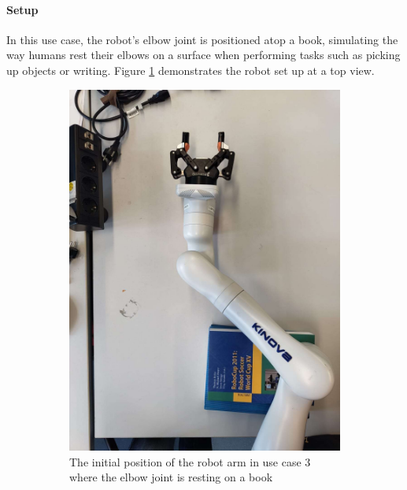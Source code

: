 \documentclass[report.tex]{subfiles}
\begin{document}
    \paragraph{\large{Setup}\\}
    In this use case, the robot's elbow joint is positioned atop a book, simulating the way humans rest their elbows on a surface when performing tasks such as picking up objects or writing. Figure \ref{fig:us3_init} demonstrates the robot set up at a top view.
    \begin{figure}[H]
        \captionsetup[subfigure]{justification=centering}
        \begin{subfigure}{0.5\textwidth}
        \includegraphics[width=\linewidth]{images/us3_initial.jpg}
        \caption{The initial position of the robot arm in use case 3 where the elbow joint is resting on a book}
        \label{fig:us3_init}
    \end{subfigure}
        \begin{subfigure}{0.5\textwidth}

\end{subfigure}
\end{figure}
\end{document}
